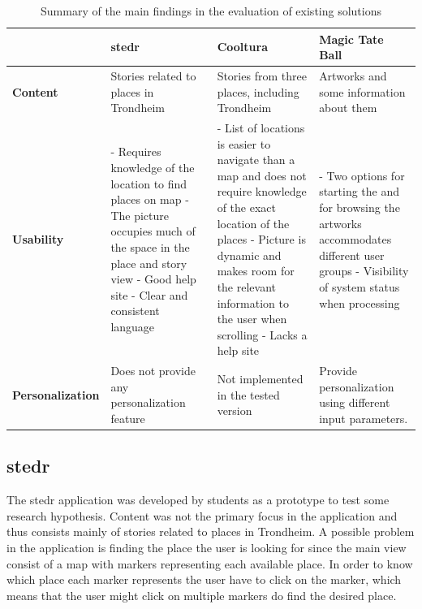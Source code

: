 \begin{table}[t]
	\caption{Summary of the main findings in the evaluation of existing solutions}
	\begin{tabular}[b]{ | p{2.7cm} | >{\raggedright}p{4.3cm} | >{\raggedright}p{4.3cm} | p{4.3cm} |}
		\hline
		\textbf{} & \textbf{stedr} & \textbf{Cooltura} & \textbf{Magic Tate Ball} \\ \hline
		\textbf{Content} & Stories related to places in Trondheim & Stories from three places, including Trondheim & Artworks and some information about them \\ \hline
		\textbf{Usability} & 
			- Requires knowledge of the location to find places on map \newline
			- The picture occupies much of the space in the place and story view \newline
			- Good help site\newline
			- Clear and consistent language 
			& 
			- List of locations is easier to navigate than a map and does not require knowledge of the exact location of the places\newline
			- Picture is dynamic and makes room for the relevant information to the user when scrolling \newline
			- Lacks a help site
			&  
			- Two options for starting the and for browsing the artworks accommodates different user groups \newline
			- Visibility of system status when processing 		
			 \\ \hline
		\textbf{Personalization} & Does not provide any personalization feature & Not implemented in the tested version & Provide personalization using different input parameters.  \\ \hline
	\end{tabular}
	\label{Tab:existing_solutions}
\end{table}

\subsection{stedr}
\label{subsec:stedr}

The stedr application was developed by students as a prototype to test some research hypothesis. Content was not the primary focus in the application and thus consists mainly of stories related to places in Trondheim. A possible problem in the application is finding the place the user is looking for since the main view consist of a map with markers representing each available place. In order to know which place each marker represents the user have to click on the marker, which means that the user might click on multiple markers do find the desired place. \newline 

